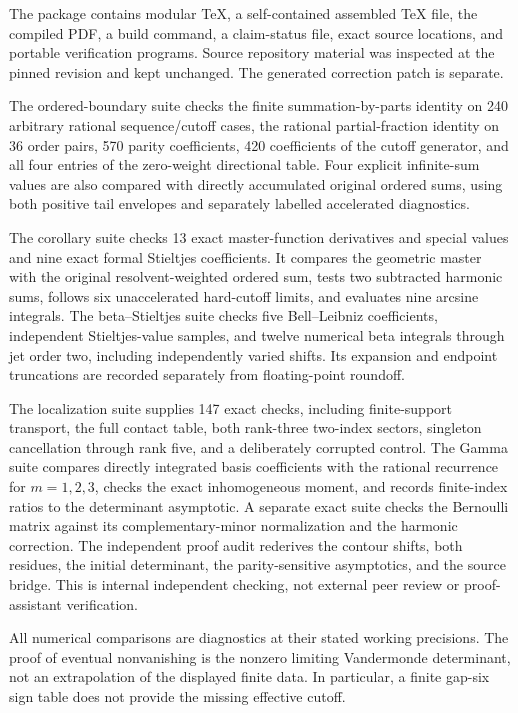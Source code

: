 The package contains modular TeX, a self-contained assembled TeX
file, the compiled PDF, a build command, a claim-status file, exact
source locations, and portable verification programs. Source
repository material was inspected at the pinned revision and kept
unchanged. The generated correction patch is separate.

The ordered-boundary suite checks the finite summation-by-parts
identity on 240 arbitrary rational sequence/cutoff cases, the rational
partial-fraction identity on 36 order pairs, 570 parity coefficients,
420 coefficients of the cutoff generator, and all four entries of
the zero-weight directional table. Four explicit infinite-sum values
are also compared with directly accumulated original ordered sums,
using both positive tail envelopes and separately labelled accelerated
diagnostics.

The corollary suite checks 13 exact master-function derivatives and
special values and nine exact formal Stieltjes coefficients. It
compares the geometric master with the original resolvent-weighted
ordered sum, tests two subtracted harmonic sums, follows six
unaccelerated hard-cutoff limits, and evaluates nine arcsine integrals.
The beta--Stieltjes suite checks five Bell--Leibniz coefficients,
independent Stieltjes-value samples, and twelve numerical beta
integrals through jet order two, including independently varied
shifts. Its expansion and endpoint truncations are recorded
separately from floating-point roundoff.

The localization suite supplies 147 exact checks, including
finite-support transport, the full contact table, both rank-three
two-index sectors, singleton cancellation through rank five, and a
deliberately corrupted control. The Gamma suite compares directly
integrated basis coefficients with the rational recurrence for
$m=1,2,3$, checks the exact inhomogeneous moment, and records
finite-index ratios to the determinant asymptotic. A separate exact
suite checks the Bernoulli matrix against its complementary-minor
normalization and the harmonic correction. The independent proof
audit rederives the contour shifts, both residues, the initial
determinant, the parity-sensitive asymptotics, and the source bridge.
This is internal independent checking, not external peer review or
proof-assistant verification.

All numerical comparisons are diagnostics at their stated working
precisions. The proof of eventual nonvanishing is the nonzero
limiting Vandermonde determinant, not an extrapolation of the
displayed finite data. In particular, a finite gap-six sign table
does not provide the missing effective cutoff.

